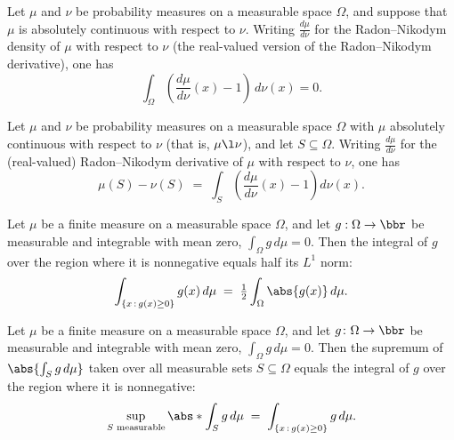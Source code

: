 \begin{theorem}
\label{CommunicationComplexity.integral_rnDensity_sub_one_eq_zero_of_ac}
\leanok
{}
Let $\mu$ and $\nu$ be probability measures on a measurable space $\Omega$, and suppose
that $\mu$ is absolutely continuous with respect to $\nu$. Writing $\frac{d\mu}{d\nu}$
for the Radon–Nikodym density of $\mu$ with respect to $\nu$ (the real-valued version of
the Radon–Nikodym derivative), one has \[ \int_{\Omega} \left(\frac{d\mu}{d\nu}(x) -
1\right)\, d\nu(x) = 0. \]
\end{theorem}

\begin{theorem}
\label{CommunicationComplexity.measureReal_sub_eq_setIntegral_rnDensity_sub_one}
\leanok
{}
Let $\mu$ and $\nu$ be probability measures on a measurable space $\Omega$ with $\mu$
absolutely continuous with respect to $\nu$ (that is, $\mu \l \nu$), and let $S
\subseteq \Omega$. Writing $\frac{d\mu}{d\nu}$ for the (real-valued) Radon–Nikodym
derivative of $\mu$ with respect to $\nu$, one has
\[
  \mu(S) - \nu(S) \;=\; \int_{S} \left( \frac{d\mu}{d\nu}(x) - 1 \right) d\nu(x).
\]
\end{theorem}

\begin{theorem}
\label{CommunicationComplexity.integral_nonneg_part_eq_half_integral_abs_of_integral_eq_zero}
\leanok
{}
Let $\mu$ be a finite measure on a measurable space $\Omega$, and let $g : \Omega \to
\bbr$ be measurable and integrable with mean zero, $\int_\Omega g\,d\mu = 0$. Then the
integral of $g$ over the region where it is nonnegative equals half its $L^1$ norm:
\[
  \int_{\{x\,:\,g(x)\ge 0\}} g(x)\,d\mu \;=\; \tfrac{1}{2}\int_\Omega \abs{g(x)}\,d\mu.
\]
\end{theorem}

\begin{theorem}
\label{CommunicationComplexity.sSup_abs_setIntegral_eq_nonneg_part_of_integral_eq_zero}
\leanok
{}
Let $\mu$ be a finite measure on a measurable space $\Omega$, and let $g \colon \Omega
\to \bbr$ be measurable and integrable with mean zero, $\int_\Omega g\,d\mu = 0$. Then
the supremum of $\abs{\int_S g\,d\mu}$ taken over all measurable sets $S \subseteq
\Omega$ equals the integral of $g$ over the region where it is nonnegative:
\[
\sup_{S\text{ measurable}} \abs*{\int_S g\,d\mu} \;=\; \int_{\{x \,:\, g(x) \ge 0\}}
g\,d\mu.
\]
\end{theorem}

